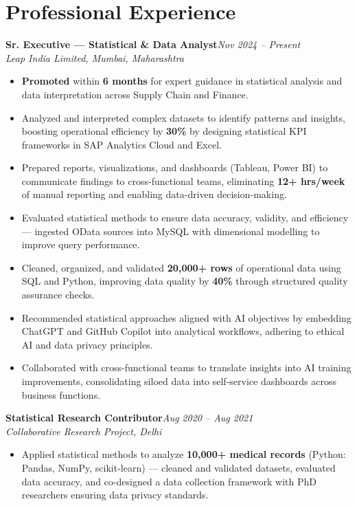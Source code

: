 \documentclass[10pt, letterpaper]{article}
\newcommand{\role}[3]{%
  \vspace{2pt}%
  {\bfseries #1}\hfill{\small\color{muted}\textit{#3}}\\[-2pt]%
  {\small\color{muted}\textit{#2}}%
}
\begin{document}
\section{Professional Experience}

\role{Sr. Executive — Statistical \& Data Analyst}{Leap India Limited, Mumbai, Maharashtra}{Nov 2024 – Present}

\begin{itemize}
  \item \textbf{Promoted} within \textbf{6 months} for expert guidance in statistical analysis and data interpretation across Supply Chain and Finance.
  \item Analyzed and interpreted complex datasets to identify patterns and insights, boosting operational efficiency by \textbf{30\%} by designing statistical KPI frameworks in SAP Analytics Cloud and Excel.
  \item Prepared reports, visualizations, and dashboards (Tableau, Power BI) to communicate findings to cross-functional teams, eliminating \textbf{12+ hrs/week} of manual reporting and enabling data-driven decision-making.
  \item Evaluated statistical methods to ensure data accuracy, validity, and efficiency — ingested OData sources into MySQL with dimensional modelling to improve query performance.
  \item Cleaned, organized, and validated \textbf{20,000+ rows} of operational data using SQL and Python, improving data quality by \textbf{40\%} through structured quality assurance checks.
  \item Recommended statistical approaches aligned with AI objectives by embedding ChatGPT and GitHub Copilot into analytical workflows, adhering to ethical AI and data privacy principles.
  \item Collaborated with cross-functional teams to translate insights into AI training improvements, consolidating siloed data into self-service dashboards across business functions.
\end{itemize}

\vspace{1pt}

\role{Statistical Research Contributor}{Collaborative Research Project, Delhi}{Aug 2020 – Aug 2021}

\begin{itemize}
  \item Applied statistical methods to analyze \textbf{10,000+ medical records} (Python: Pandas, NumPy, scikit-learn) — cleaned and validated datasets, evaluated data accuracy, and co-designed a data collection framework with PhD researchers ensuring data privacy standards.
\end{itemize}
\end{document}
